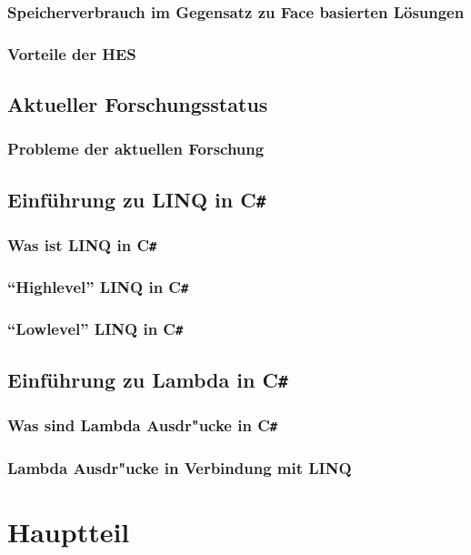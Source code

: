 \documentclass[12pt,a4paper]{scrreprt}
\newcommand{\CS}{C\texttt{\#}}
\begin{document}
		\subsection {Speicherverbrauch im Gegensatz zu Face basierten Lösungen}
		\subsection {Vorteile der HES}
	\section {Aktueller Forschungsstatus}
		\subsection {Probleme der aktuellen Forschung}
	\section {Einführung zu LINQ in \CS}
		\subsection {Was ist LINQ in \CS}
		\subsection {"`Highlevel"' LINQ in \CS}
		\subsection {"`Lowlevel"' LINQ in \CS}
	\section {Einführung zu Lambda in \CS}
		\subsection {Was sind Lambda Ausdr"ucke in \CS}
		\subsection {Lambda Ausdr"ucke in Verbindung mit LINQ}




\chapter {Hauptteil}
\end{document}
